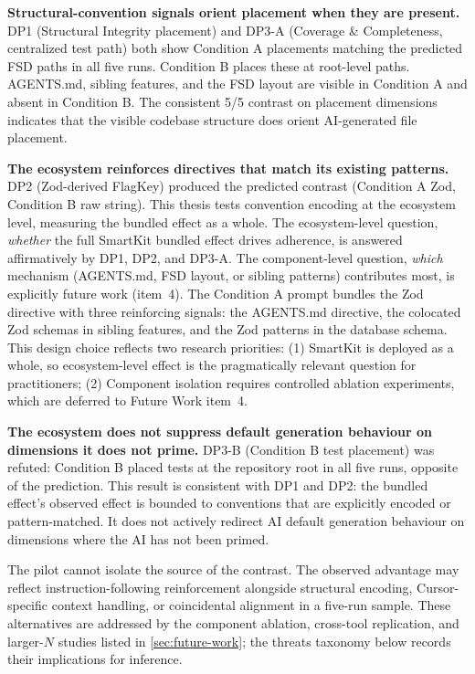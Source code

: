 \documentclass[12pt,a4paper]{report}
\begin{document}
\textbf{Structural-convention signals orient placement when they are present.} DP1 (Structural Integrity placement) and DP3-A (Coverage \& Completeness, centralized test path) both show Condition A placements matching the predicted FSD paths in all five runs. Condition B places these at root-level paths. AGENTS.md, sibling features, and the FSD layout are visible in Condition A and absent in Condition B. The consistent 5/5 contrast on placement dimensions indicates that the visible codebase structure does orient AI-generated file placement.

\textbf{The ecosystem reinforces directives that match its existing patterns.} DP2 (Zod-derived FlagKey) produced the predicted contrast (Condition A Zod, Condition B raw string). This thesis tests convention encoding at the ecosystem level, measuring the bundled effect as a whole. The ecosystem-level question, \emph{whether} the full SmartKit bundled effect drives adherence, is answered affirmatively by DP1, DP2, and DP3-A. The component-level question, \emph{which} mechanism (AGENTS.md, FSD layout, or sibling patterns) contributes most, is explicitly future work (item~4). The Condition A prompt bundles the Zod directive with three reinforcing signals: the AGENTS.md directive, the colocated Zod schemas in sibling features, and the Zod patterns in the database schema. This design choice reflects two research priorities: (1) SmartKit is deployed as a whole, so ecosystem-level effect is the pragmatically relevant question for practitioners; (2) Component isolation requires controlled ablation experiments, which are deferred to Future Work item~4.

\textbf{The ecosystem does not suppress default generation behaviour on dimensions it does not prime.} DP3-B (Condition B test placement) was refuted: Condition B placed tests at the repository root in all five runs, opposite of the prediction. This result is consistent with DP1 and DP2: the bundled effect's observed effect is bounded to conventions that are explicitly encoded or pattern-matched. It does not actively redirect AI default generation behaviour on dimensions where the AI has not been primed.

The pilot cannot isolate the source of the contrast. The observed advantage may reflect instruction-following reinforcement alongside structural encoding, Cursor-specific context handling, or coincidental alignment in a five-run sample. These alternatives are addressed by the component ablation, cross-tool replication, and larger-$N$ studies listed in \autoref{sec:future-work}; the threats taxonomy below records their implications for inference.
\end{document}
